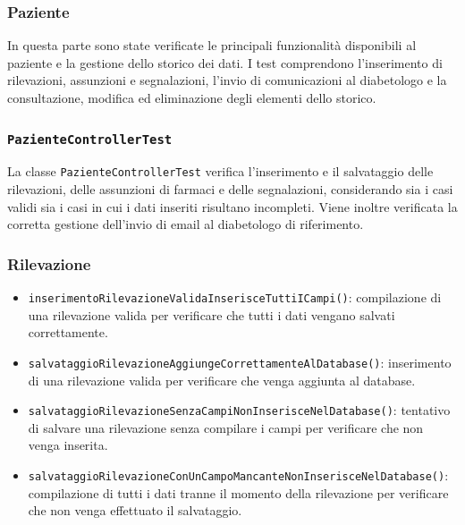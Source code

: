 \subsubsection*{Paziente}

In questa parte sono state verificate le principali funzionalità disponibili al paziente e la gestione dello storico dei dati. I test comprendono l'inserimento di rilevazioni, assunzioni e segnalazioni, l'invio di comunicazioni al diabetologo e la consultazione, modifica ed eliminazione degli elementi dello storico.

\subsubsection*{\texttt{PazienteControllerTest}}

La classe \texttt{PazienteControllerTest} verifica l'inserimento e il salvataggio delle rilevazioni, delle assunzioni di farmaci e delle segnalazioni, considerando sia i casi validi sia i casi in cui i dati inseriti risultano incompleti. Viene inoltre verificata la corretta gestione dell'invio di email al diabetologo di riferimento.

\subsubsection*{Rilevazione}

\begin{itemize}
	
	\item \texttt{inserimentoRilevazioneValidaInserisceTuttiICampi()}: compilazione di una rilevazione valida per verificare che tutti i dati vengano salvati correttamente.
	
	\item \texttt{salvataggioRilevazioneAggiungeCorrettamenteAlDatabase()}: inserimento di una rilevazione valida per verificare che venga aggiunta al database.
	
	\item \texttt{salvataggioRilevazioneSenzaCampiNonInserisceNelDatabase()}: tentativo di salvare una rilevazione senza compilare i campi per verificare che non venga inserita.
	
	\item \texttt{salvataggioRilevazioneConUnCampoMancanteNonInserisceNelDatabase()}: compilazione di tutti i dati tranne il momento della rilevazione per verificare che non venga effettuato il salvataggio.
	
\end{itemize}

